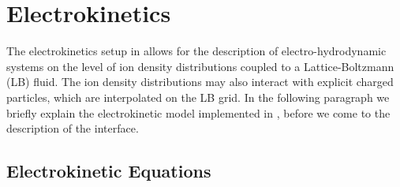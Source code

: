 \newcommand{\lb}{l_\mathrm{B}}
\newcommand{\kT}{k_\mathrm{B}T}

\chapter{\label{sec:electrokinetics}Electrokinetics}

The electrokinetics setup in \es{} allows for the description of 
electro-hydrodynamic systems on the level of ion density distributions coupled 
to a Lattice-Boltzmann (LB) fluid. The ion density distributions may also
interact with explicit charged particles, which are interpolated on the LB grid.
In the following paragraph we briefly explain the electrokinetic model
implemented in \es{}, before we come to the description of the interface.

\section{Electrokinetic Equations}

